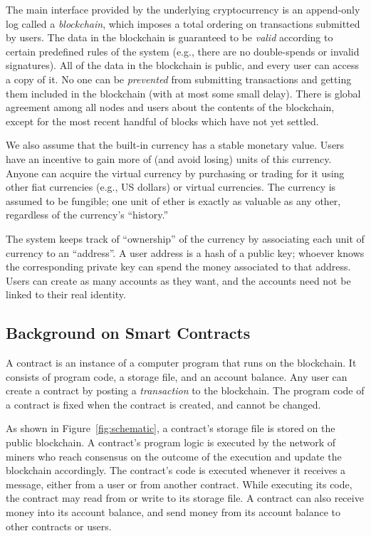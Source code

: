 \documentclass{llncs}
\begin{document}
The main interface provided by the underlying cryptocurrency is an append-only log called a \emph{blockchain}, which imposes a total ordering on transactions submitted by users. The data in the blockchain is guaranteed to be \emph{valid} according to certain predefined rules of the system (e.g., there are no double-spends or invalid signatures). All of the data in the blockchain is public, and every user can access a copy of it. No one can be \emph{prevented} from submitting transactions and getting them included in the blockchain (with at most some small delay). There is global agreement among all nodes and users about the contents of the blockchain,  except for the most recent handful of blocks which have not yet settled.

We also assume that the built-in currency has a stable monetary value. Users have an incentive to gain more of (and avoid losing) units of this currency. Anyone can acquire 
the virtual currency by purchasing or trading for it using 
other fiat currencies (e.g., US dollars) or virtual currencies. The currency is assumed to be fungible; one unit of ether is exactly as valuable as any other, regardless of the currency's ``history.''

The system keeps track of ``ownership'' of the currency by associating each unit of currency to an ``address''. 
A user address is a hash of a public key; whoever knows the corresponding private key can spend the money associated to that address. Users can create as many accounts as they want, and the accounts need not be linked to their real identity.

\subsection{Background on Smart Contracts}
A contract is an instance of a computer program that runs on the blockchain. It consists of program code, a storage file, and an account balance.
Any user can create a contract by posting a {\it transaction} to the blockchain.
The program code of a contract is fixed when the contract is created, and cannot be changed.

As shown in Figure~\ref{fig:schematic}, a contract's storage file is stored on the public blockchain.
A contract's program logic is executed by the network of miners 
who reach consensus on the outcome of the execution  
and update the blockchain accordingly.
The contract's code is executed whenever it receives a message, 
either from a user or from another contract.
While executing its code, the contract may read from or write to its storage file.
A contract can also receive money into its account balance, and send money from its account balance to other contracts or users.
\end{document}

